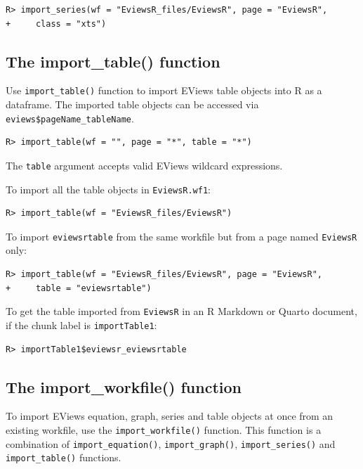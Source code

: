 \begin{verbatim}
R> import_series(wf = "EviewsR_files/EviewsR", page = "EviewsR",
+     class = "xts")
\end{verbatim}

\hypertarget{the-import_table-function}{%
\subsection{The import\_table() function}\label{the-import_table-function}}

Use \texttt{import\_table()} function to import EViews table objects into R as a dataframe. The imported table objects can be accessed via \texttt{eviews\$pageName\_tableName}.

\begin{verbatim}
R> import_table(wf = "", page = "*", table = "*")
\end{verbatim}

The \texttt{table} argument accepts valid EViews wildcard expressions.

To import all the table objects in \texttt{EviewsR.wf1}:

\begin{verbatim}
R> import_table(wf = "EviewsR_files/EviewsR")
\end{verbatim}

To import \texttt{eviewsrtable} from the same workfile but from a page named \texttt{EviewsR} only:

\begin{verbatim}
R> import_table(wf = "EviewsR_files/EviewsR", page = "EviewsR",
+     table = "eviewsrtable")
\end{verbatim}

To get the table imported from \texttt{EviewsR} in an R Markdown or Quarto document, if the chunk label is \texttt{importTable1}:

\begin{verbatim}
R> importTable1$eviewsr_eviewsrtable
\end{verbatim}

\hypertarget{the-import_workfile-function}{%
\subsection{The import\_workfile() function}\label{the-import_workfile-function}}

To import EViews equation, graph, series and table objects at once from an existing workfile, use the \texttt{import\_workfile()} function. This function is a combination of \texttt{import\_equation()}, \texttt{import\_graph()}, \texttt{import\_series()} and \texttt{import\_table()} functions.

